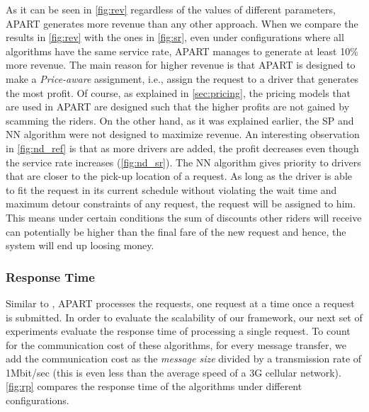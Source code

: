 As it can be seen in \cref{fig:rev} regardless of the values of different parameters, APART generates more revenue than any other approach. When we compare the results in \cref{fig:rev} with the ones in \cref{fig:sr}, even under configurations where all algorithms have the same service rate, APART manages to generate at least 10\% more revenue. The main reason for higher revenue is that APART is designed to make a \textit{Price-aware} assignment, i.e., assign the request to a driver that generates the most profit. Of course, as explained in \cref{sec:pricing}, the pricing models that are used in APART are designed such that the higher profits are not gained by scamming the riders. On the other hand, as it was explained earlier, the SP and NN algorithm were not designed to maximize revenue. An interesting observation in \cref{fig:nd_ref} is that as more drivers are added, the profit decreases even though the service rate increases (\cref{fig:nd_sr}). The NN algorithm gives priority to drivers that are closer to the pick-up location of a request. As long as the driver is able to fit the request in its current schedule without violating the wait time and maximum detour constraints of any request, the request will be assigned to him. This means under certain conditions the sum of discounts other riders will receive can potentially be higher than the final fare of the new request and hence, the system will end up loosing money.

\subsubsection{Response Time}

Similar to \cite{Ma13,Huang14}, APART processes the requests, one request at a time once a request is submitted. In order to evaluate the scalability of our framework, our next set of experiments evaluate the response time of processing a single request. To count for the communication cost of these algorithms, for every message transfer, we add the communication cost as the \textit{message size} divided by a transmission rate of 1Mbit/sec (this is even less than the average speed of a 3G cellular network). \cref{fig:rp} compares the response time of the algorithms under different configurations.

